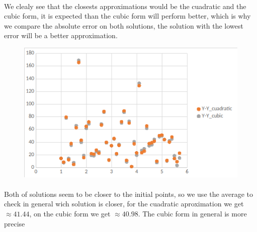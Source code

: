 \documentclass{article}
\begin{document}
\paragraph{}We clealy see that the closests approximations would be the cuadratic and the cubic form, it is expected than the cubic form will perform better, which is why we compare the absolute error on both solutions, the solution with the lowest error will be a better approximation.\newpage
\begin{figure}[h!]
	\centering
	\includegraphics[width=0.5\linewidth]{7.png}
\end{figure}
\paragraph{} Both of solutions seem to be closer to the initial points, so we use the average to check in general wich solution is closer, for the cuadratic aproximation we get $\approx 41.44$, on the cubic form we get $\approx 40.98$. The cubic form in general is more precise
\end{document}

